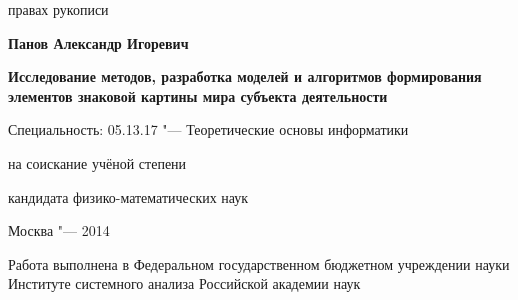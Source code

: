 \newcommand{\sfs}{\fontsize{14pt}{15pt}\selectfont}
\sfs %
\thispagestyle{empty}

\vspace{10mm}
\begin{flushright}
   правах рукописи
\end{flushright}

\vspace{30mm}
\begin{center}
{\Large\bf Панов Александр Игоревич}
\end{center}

\vspace{30mm}
\begin{center}
{\bf \LARGE Исследование методов, разработка моделей и алгоритмов формирования элементов знаковой картины мира субъекта деятельности
\par}

\vspace{30mm}
{\Large
Специальность: 05.13.17 "--- Теоретические основы информатики
}

\vspace{15mm}
\par
{} на соискание учёной степени\par
кандидата физико-математических наук
\end{center}

\vspace{40mm}
\begin{center}
{\Large Москва "--- 2014}
\end{center}

\newpage
\thispagestyle{empty}
\noindent Работа выполнена в Федеральном государственном бюджетном учреждении науки Институте системного анализа Российской академии наук


